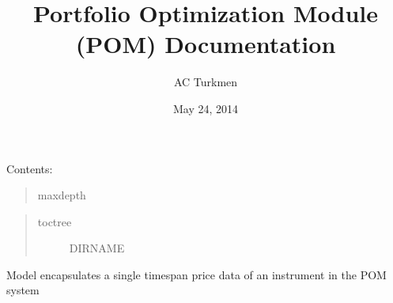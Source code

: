 \documentclass[letterpaper,10pt,english]{sphinxmanual}
\title{Portfolio Optimization Module (POM) Documentation}
\date{May 24, 2014}
\author{AC Turkmen}
\begin{document}
\maketitle
\tableofcontents
{}\label{index::doc}


Contents:
\begin{quote}\begin{description}
\item[{maxdepth}] 

\end{description}\end{quote}
\begin{quote}\begin{description}
\item[{toctree}] \leavevmode
DIRNAME

\end{description}\end{quote}
\label{index:module-model.models}

\begin{fulllineitems}
\label{index:model.models.IBar}
Model encapsulates a single timespan price data of an instrument in the POM system

\end{fulllineitems}

\end{document}

